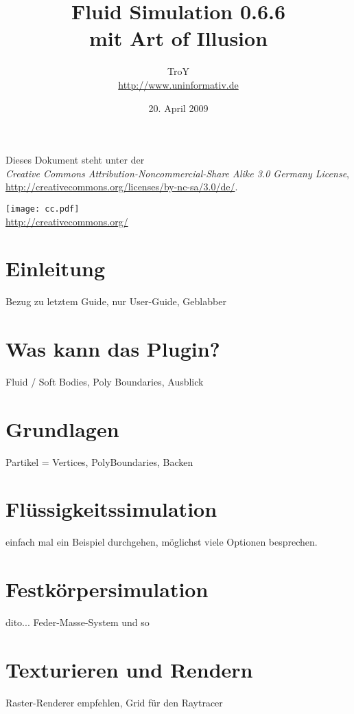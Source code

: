 \documentclass[12pt,a4paper]{scrartcl}
\begin{document}
\author{TroY \\ \url{http://www.uninformativ.de}}
\title{Fluid Simulation 0.6.6 \\ mit Art of Illusion}
\date{20. April 2009}
\maketitle
\thispagestyle{empty}

\vspace{100mm}

\begin{center}
	Dieses Dokument steht unter der \\
	\textit{Creative Commons Attribution-Noncommercial-Share Alike 3.0 Germany License}, \\
	\url{http://creativecommons.org/licenses/by-nc-sa/3.0/de/}.

	\texttt{[image: cc.pdf]} \\
	\url{http://creativecommons.org/}
\end{center}

\pagebreak


\tableofcontents
\thispagestyle{empty}
\pagebreak



\section{Einleitung}
Bezug zu letztem Guide, nur User-Guide, Geblabber
\section{Was kann das Plugin?}
Fluid / Soft Bodies, Poly Boundaries, Ausblick
\section{Grundlagen}
Partikel = Vertices, PolyBoundaries, Backen
\section{Flüssigkeitssimulation}
einfach mal ein Beispiel durchgehen, möglichst viele Optionen
besprechen.
\section{Festkörpersimulation}
dito... Feder-Masse-System und so
\section{Texturieren und Rendern}
Raster-Renderer empfehlen, Grid für den Raytracer
\end{document}
